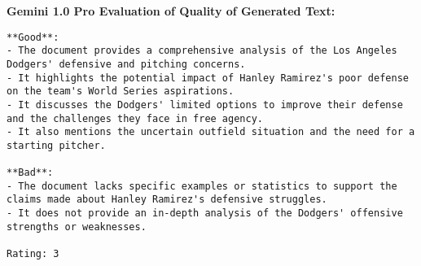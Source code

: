 {\bf\ttfamily Gemini 1.0 Pro Evaluation of Quality of Generated Text:}
\begin{lstlisting}
**Good**:
- The document provides a comprehensive analysis of the Los Angeles Dodgers' defensive and pitching concerns.
- It highlights the potential impact of Hanley Ramirez's poor defense on the team's World Series aspirations.
- It discusses the Dodgers' limited options to improve their defense and the challenges they face in free agency.
- It also mentions the uncertain outfield situation and the need for a starting pitcher.

**Bad**:
- The document lacks specific examples or statistics to support the claims made about Hanley Ramirez's defensive struggles.
- It does not provide an in-depth analysis of the Dodgers' offensive strengths or weaknesses.

Rating: 3
\end{lstlisting}

